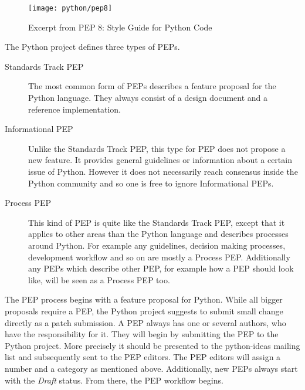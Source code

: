 \begin{figure}[htbp]
  \centering
  \texttt{[image: python/pep8]}
  \caption{Excerpt from \ac{PEP} 8: Style Guide for Python Code}
\end{figure}

The Python project defines three types of \acp{PEP}.

\begin{description}

  \item[Standards Track PEP] The most common form of \acp{PEP} describes a
    feature proposal for the Python language. They always consist of a design
    document and a reference implementation.

  \item[Informational PEP] Unlike the Standards Track \ac{PEP}, this type for
    \ac{PEP} does not propose a new feature. It provides general guidelines or
    information about a certain issue of Python. However it does not
    necessarily reach consensus inside the Python community and so one is free
    to ignore Informational \acp{PEP}.

  \item[Process PEP] This kind of \ac{PEP} is quite like the Standards Track
    \ac{PEP}, except that it applies to other areas than the Python language
    and describes processes around Python. For example any guidelines, decision
    making processes, development workflow and so on are mostly a Process
    \ac{PEP}. Additionally any \acp{PEP} which describe other \ac{PEP}, for
    example how a \ac{PEP} should look like, will be seen as a Process \ac{PEP}
    too.

\end{description}

The \ac{PEP} process begins with a feature proposal for Python. While all
bigger proposals require a \ac{PEP}, the Python project suggests to submit
small change directly as a patch submission. A \ac{PEP} always has one or
several authors, who have the responsibility for it. They will begin by
submitting the \ac{PEP} to the Python project. More precisely it should be
presented to the python-ideas mailing list and subsequently sent to the
\ac{PEP} editors. The \ac{PEP} editors will assign a number and a category as
mentioned above. Additionally, new \acp{PEP} always start with the \emph{Draft}
status. From there, the \ac{PEP} workflow begins.

